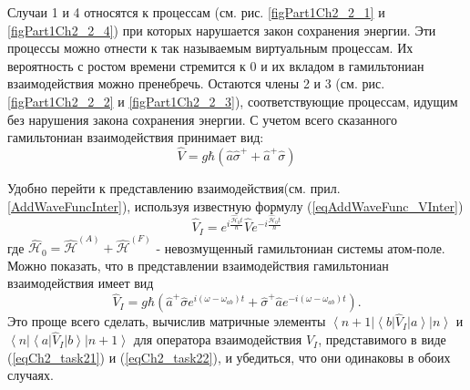 Случаи 1 и 4 относятся к процессам (см. рис. \ref{figPart1Ch2_2_1} и
\ref{figPart1Ch2_2_4}) при которых нарушается закон сохранения энергии.
Эти процессы можно отнести к так называемым виртуальным процессам. Их
вероятность с ростом времени стремится к 0 и
их вкладом в гамильтониан взаимодействия можно
пренебречь. Остаются члены 2 и 3 (см. рис. \ref{figPart1Ch2_2_2} и
\ref{figPart1Ch2_2_3}), соответствующие процессам,
идущим без нарушения закона сохранения энергии. С учетом всего
сказанного гамильтониан взаимодействия принимает вид: 
\begin{equation}
\hat{V} = g \hbar \left(
\hat{a}\hat{\sigma}^{+} + 
\hat{a}^{+}\hat{\sigma}
\right)
\end{equation}

Удобно перейти к представлению взаимодействия(см. прил. \ref{AddWaveFuncInter}),
используя известную 
формулу (\ref{eqAddWaveFunc_VInter})
\begin{equation}
\hat{V}_I = 
e^{i \frac{\hat{\mathcal{H}}_0 t}{\hbar}}
\hat{V}
e^{- i \frac{\hat{\mathcal{H}}_0 t}{\hbar}}
\label{eqCh2_task21}
\end{equation}
где 
\(
\hat{\mathcal{H}}_0 = 
\hat{\mathcal{H}}^{\left(A\right)} +
\hat{\mathcal{H}}^{\left(F\right)}
\)
- невозмущенный гамильтониан системы атом-поле. Можно показать, что в
представлении взаимодействия гамильтониан взаимодействия имеет вид 
\begin{equation}
\hat{V}_I = 
g \hbar \left(
\hat{a}^{+}\hat{\sigma} e^{i \left(\omega - \omega_{ab}\right)t} +
\hat{\sigma}^{+} \hat{a} e^{-i \left(\omega - \omega_{ab}\right)t}
\right).
\label{eqCh2_task22}
\end{equation}
Это проще всего сделать, вычислив матричные элементы 
$\left<n +
1\right|\left<b\right|\hat{V}_I\left|a\right>\left|n\right>$ и
$\left<n\right|\left<a\right|\hat{V}_I\left|b\right>\left|n +
1\right>$ для оператора взаимодействия $\hat{V}_I$, представимого в
виде (\ref{eqCh2_task21}) и (\ref{eqCh2_task22}), и убедиться, что они
одинаковы в обоих случаях.
